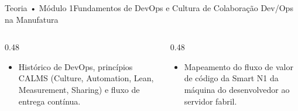 \begin{senaiframe}{Teoria • Módulo 1}{Fundamentos de DevOps e Cultura de Colaboração Dev/Ops na Manufatura}
  \begin{columns}[t]
    \begin{column}{0.48\textwidth}
      \begin{tcolorbox}[senaibluecard, title={Fundamentos Teóricos}]
        \begin{itemize}
          \item Histórico de DevOps, princípios CALMS (Culture, Automation, Lean, Measurement, Sharing) e fluxo de entrega contínua.
        \end{itemize}
      \end{tcolorbox}
    \end{column}
    \begin{column}{0.48\textwidth}
      \begin{tcolorbox}[senaigreencard, title={Prática \& Laboratório}]
        \begin{itemize}
          \item Mapeamento do fluxo de valor de código da Smart N1 da máquina do desenvolvedor ao servidor fabril.
        \end{itemize}
      \end{tcolorbox}
    \end{column}
  \end{columns}
\end{senaiframe}
